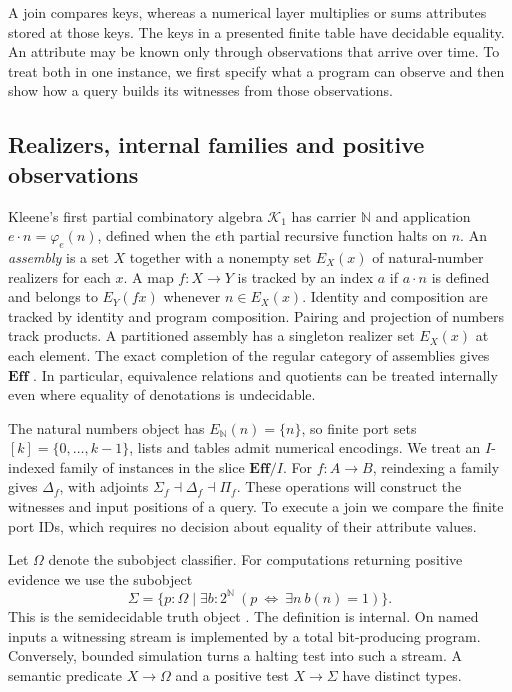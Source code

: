 \documentclass[11pt,a4paper]{article}
\theoremstyle{definition}
\theoremstyle{remark}\newaliascnt{remark}{theorem}
\newcommand{\E}{\mathbf{Eff}}
\newcommand{\N}{\mathbb N}
\numberwithin{equation}{section}
\begin{document}
A join compares keys, whereas a numerical layer multiplies or sums attributes stored at those keys. The keys in a presented finite table have decidable equality. An attribute may be known only through observations that arrive over time. To treat both in one instance, we first specify what a program can observe and then show how a query builds its witnesses from those observations.

\subsection{Realizers, internal families and positive observations}
Kleene's first partial combinatory algebra \(\mathcal K_1\) has carrier \(\mathbb N\) and application \(e\cdot n=\varphi_e(n)\), defined when the \(e\)th partial recursive function halts on \(n\). An \emph{assembly} is a set \(X\) together with a nonempty set \(E_X(x)\) of natural-number realizers for each \(x\). A map \(f:X\to Y\) is tracked by an index \(a\) if \(a\cdot n\) is defined and belongs to \(E_Y(fx)\) whenever \(n\in E_X(x)\). Identity and composition are tracked by identity and program composition. Pairing and projection of numbers track products. A partitioned assembly has a singleton realizer set $E_X(x)$ at each element. The exact completion of the regular category of assemblies gives \(\E\) \cite{van-oosten}. In particular, equivalence relations and quotients can be treated internally even where equality of denotations is undecidable.

The natural numbers object has $E_{\N}(n)=\{n\}$, so finite port sets $[k]=\{0,\ldots,k-1\}$, lists and tables admit numerical encodings. We treat an $I$-indexed family of instances in the slice $\E/I$. For $f:A\to B$, reindexing a family gives $\Delta_f$, with adjoints $\Sigma_f\dashv\Delta_f\dashv\Pi_f$. These operations will construct the witnesses and input positions of a query. To execute a join we compare the finite port IDs, which requires no decision about equality of their attribute values.

Let \(\Omega\) denote the subobject classifier. For computations returning positive evidence we use the subobject
\[
 \Sigma=\{p:\Omega\mid\exists b:2^{\N}\
          (p\ \Leftrightarrow\ \exists n\ b(n)=1)\}.
\]
This is the semidecidable truth object \cite[\S3.2]{bauer}. The definition is internal. On named inputs a witnessing stream is implemented by a total bit-producing program. Conversely, bounded simulation turns a halting test into such a stream. A semantic predicate \(X\to\Omega\) and a positive test \(X\to\Sigma\) have distinct types.
\end{document}
